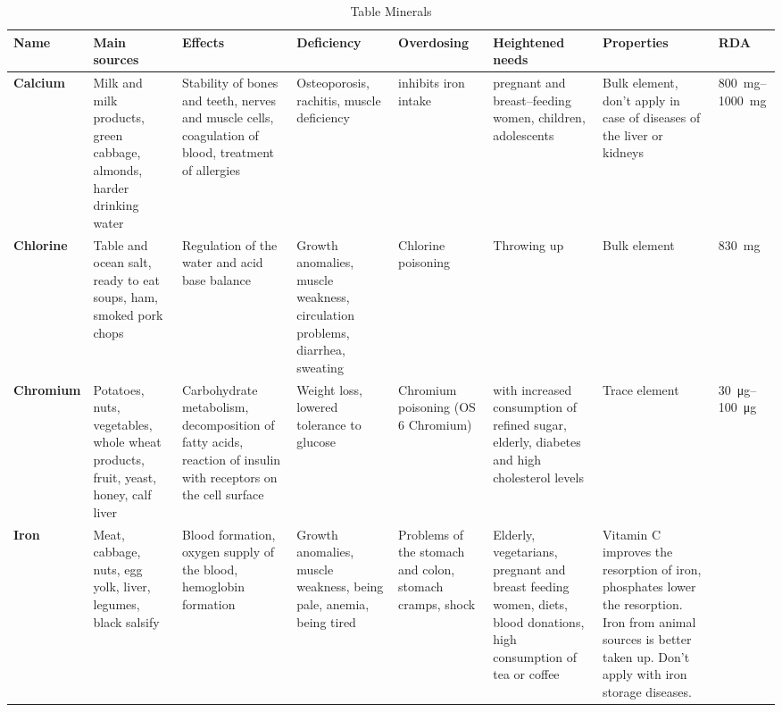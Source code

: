 \documentclass[../main.tex]{subfiles}
\begin{document}

\clearpage
\thispagestyle{empty}

\begin{sidewaystable}[p!]
  \caption{Table Minerals}
  \centering
  \begin{small}
  \begin{tabularx}{\textwidth}{p{1.2cm}p{2.5cm}p{3cm}p{3cm}p{2.3cm}p{2.5cm}p{3cm}p{1cm}}
    \toprule 
    \textbf{Name} &\textbf{Main sources} & \textbf{Effects} &\textbf{Deficiency} & \textbf{Overdosing} & \textbf{Heightened needs} & \textbf{Properties} & \textbf{RDA} \\
    \midrule
    \textbf{Calcium}\index{mineral!calcium} &
    Milk and milk products, green cabbage, almonds, harder drinking water &
    Stability of bones and teeth, nerves and muscle cells, coagulation of blood, treatment of allergies &
    Osteoporosis, rachitis, muscle deficiency &
    inhibits iron intake &
    pregnant and breast--feeding women, children, adolescents &
    Bulk element, don't apply in case of diseases of the liver or kidneys & 
    \SIrange{800}{1000}{\mg} \\
    \textbf{Chlorine}\index{mineral!chlorine} &
    Table and ocean salt, ready to eat soups, ham, smoked pork chops &
    Regulation of the water and acid base balance &
    Growth anomalies, muscle weakness, circulation problems, diarrhea, sweating &
    Chlorine poisoning &
    Throwing up &
    Bulk element &
    \SI{830}{\mg}\\
    \textbf{Chrom\-ium}\index{mineral!chromium} &
    Potatoes, nuts, vegetables, whole wheat products, fruit,  yeast, honey, calf liver &
    Carbohydrate metabolism, decomposition of fatty acids, reaction of insulin with receptors on the cell surface &
    Weight loss, lowered tolerance to glucose &
    Chromium poisoning (OS 6 Chromium) &
    with increased consumption of refined sugar, elderly, diabetes and high cholesterol levels &
    Trace element &
    \SIrange{30}{100}{\micro\gram} \\
    \textbf{Iron}\index{mineral!iron} &
    Meat, cabbage, nuts, egg yolk, liver, legumes, black salsify &
    Blood formation, oxygen supply of the blood, hemoglobin formation &
    Growth anomalies, muscle weakness, being pale, anemia, being tired &
    Problems of the stomach and colon, stomach cramps, shock &
    Elderly, vegetarians, pregnant and breast feeding women, diets, blood donations, high consumption of tea or coffee &
    Vitamin C improves the resorption of iron, phosphates lower the resorption. Iron from animal sources is better taken up. Don't apply with iron storage diseases. &

\end{tabularx}
\end{small}
\end{sidewaystable}
\end{document}
